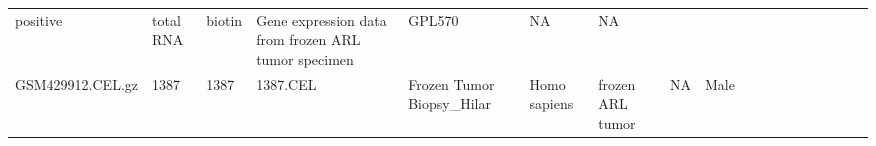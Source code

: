 \documentclass[]{article}
\begin{document}
\begin{longtable}[]{@{}lllllllrllllllllll@{}}
\begin{minipage}[t]{0.04\columnwidth}
positive\strut
\end{minipage} & \begin{minipage}[t]{0.02\columnwidth}\raggedright
total RNA\strut
\end{minipage} & \begin{minipage}[t]{0.01\columnwidth}\raggedright
biotin\strut
\end{minipage} & \begin{minipage}[t]{0.08\columnwidth}\raggedright
Gene expression data from frozen ARL tumor specimen\strut
\end{minipage} & \begin{minipage}[t]{0.01\columnwidth}\raggedright
GPL570\strut
\end{minipage} & \begin{minipage}[t]{0.00\columnwidth}\raggedright
NA\strut
\end{minipage} & \begin{minipage}[t]{0.01\columnwidth}\raggedright
NA\strut
\end{minipage}\tabularnewline
\begin{minipage}[t]{0.03\columnwidth}\raggedright
GSM429912.CEL.gz\strut
\end{minipage} & \begin{minipage}[t]{0.02\columnwidth}\raggedright
1387\strut
\end{minipage} & \begin{minipage}[t]{0.01\columnwidth}\raggedright
1387\strut
\end{minipage} & \begin{minipage}[t]{0.02\columnwidth}\raggedright
1387.CEL\strut
\end{minipage} & \begin{minipage}[t]{0.06\columnwidth}\raggedright
Frozen Tumor Biopsy\_Hilar\strut
\end{minipage} & \begin{minipage}[t]{0.02\columnwidth}\raggedright
Homo sapiens\strut
\end{minipage} & \begin{minipage}[t]{0.04\columnwidth}\raggedright
frozen ARL tumor\strut
\end{minipage} & \begin{minipage}[t]{0.05\columnwidth}\raggedleft
NA\strut
\end{minipage} & \begin{minipage}[t]{0.04\columnwidth}\raggedright
Male\strut
\end{minipage} & \begin{minipage}[t]{0.06\columnwidth}\raggedright

\end{minipage}
\end{longtable}
\end{document}
